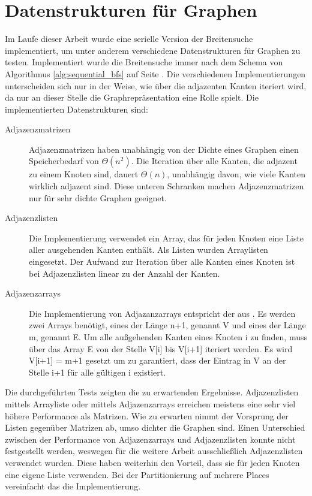 \section{Datenstrukturen für Graphen} %
\label{sec:datenstrukturen_f_r_graphen}
Im Laufe dieser Arbeit wurde eine serielle Version der Breitensuche implementiert, um unter anderem verschiedene Datenstrukturen für Graphen zu testen. Implementiert wurde die Breitensuche immer nach dem Schema von Algorithmus \ref{alg:sequential_bfs} auf Seite \pageref{alg:sequential_bfs}. Die verschiedenen Implementierungen unterscheiden sich nur in der Weise, wie über die adjazenten Kanten iteriert wird, da nur an dieser Stelle die Graphrepräsentation eine Rolle spielt. Die implementierten Datenstrukturen sind:
\begin{description}
	\item [Adjazenzmatrizen] Adjazenzmatrizen haben unabhängig von der Dichte eines Graphen einen Speicherbedarf von $\Theta(n^2)$. Die Iteration über alle Kanten, die adjazent zu einem Knoten sind, dauert $\Theta(n)$, unabhängig davon, wie viele Kanten wirklich adjazent sind. Diese unteren Schranken machen Adjazenzmatrizen nur für sehr dichte Graphen geeignet.
	\item [Adjazenzlisten] Die Implementierung verwendet ein Array, das für jeden Knoten eine Liste aller ausgehenden Kanten enthält. Als Listen wurden Arraylisten eingesetzt. Der Aufwand zur Iteration über alle Kanten eines Knoten ist bei Adjazenzlisten linear zu der Anzahl der Kanten.
	\item [Adjazenzarrays] Die Implementierung von Adjazanzarrays entspricht der aus \cite{SWB-283374373}. Es werden zwei Arrays benötigt, eines der Länge n+1, genannt V und eines der Länge m, genannt E. Um alle außgehenden Kanten eines Knoten i zu finden, muss über das Array E von der Stelle V[i] bis V[i+1] iteriert werden. Es wird V[i+1] = m+1 gesetzt um zu garantiert, dass der Eintrag in V an der Stelle i+1 für alle gültigen i existiert.
\end{description}

Die durchgeführten Tests zeigten die zu erwartenden Ergebnisse. Adjazenzlisten mittels Arrayliste oder mittels Adjazenzarrays erreichen meistens eine sehr viel höhere Performance als Matrizen. Wie zu erwarten nimmt der Vorsprung der Listen gegenüber Matrizen ab, umso dichter die Graphen sind. Einen Unterschied zwischen der Performance von Adjazenzarrays und Adjazenzlisten konnte nicht festgestellt werden, weswegen für die weitere Arbeit ausschließlich Adjazenzlisten verwendet wurden. Diese haben weiterhin den Vorteil, dass sie für jeden Knoten eine eigene Liste verwenden. Bei der Partitionierung auf mehrere Places vereinfacht das die Implementierung.

